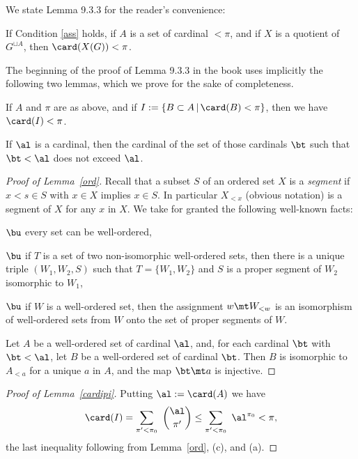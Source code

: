 \documentclass[12pt]{article}
\theoremstyle{remark}
\theoremstyle{definition}
\begin{document}
We state Lemma 9.3.3 for the reader's convenience:

\begin{lem}[Lemma 9.3.3 p.~226]
If Condition \ref{ass} holds, if $A$ is a set of cardinal $<\pi$, and if $X$ is a quotient of $G^{\sqcup A}$, then $\card(X(G))<\pi$.
\end{lem}

The beginning of the proof of Lemma 9.3.3 in the book uses implicitly the following two lemmas, which we prove for the sake of completeness.

\begin{lem}
If $A$ and $\pi$ are as above, and if $I:=\{B\subset A\,|\,\card(B)<\pi\}$, then we have $\card(I)<\pi$. 
\end{lem}

\begin{lem}
If $\al$ is a cardinal, then the cardinal of the set of those cardinals $\bt$ such that $\bt<\al$ does not exceed $\al$.
\end{lem}

\begin{proof}[Proof of Lemma~\ref{ord}]
Recall that a subset $S$ of an ordered set $X$ is a {\em segment} if $x<s\in S$ with $x\in X$ implies $x\in S$. In particular $X_{<x}$ (obvious notation) is a segment of $X$ for any $x$ in $X$. We take for granted the following well-known facts:

\nn$\bu$ every set can be well-ordered,

\nn$\bu$ if $T$ is a set of two non-isomorphic well-ordered sets, then there is a unique triple $(W_1,W_2,S)$ such that $T=\{W_1,W_2\}$ and $S$ is a proper segment of $W_2$ isomorphic to $W_1$,

\nn$\bu$ if $W$ is a well-ordered set, then the assignment $w\mt W_{<w}$ is an isomorphism of well-ordered sets from $W$ onto the set of proper segments of $W$.

Let $A$ be a well-ordered set of cardinal $\al$, and, for each cardinal $\bt$ with $\bt<\al$, let $B$ be a well-ordered set of cardinal $\bt$. Then $B$ is isomorphic to $A_{<a}$ for a unique $a$ in $A$, and the map $\bt\mt a$ is injective.
\end{proof}

\begin{proof}[Proof of Lemma~\ref{cardipi}] 
Putting $\al:=\card(A)$ we have
$$
\card(I)=\sum_{\pi'<\pi_0}\ \binom{\al}{\pi'}\le\sum_{\pi'<\pi_0}\ \al^{\pi_0}<\pi,
$$ 
the last inequality following from Lemma~\ref{ord}, (c), and (a). 
\end{proof}
\end{document}
